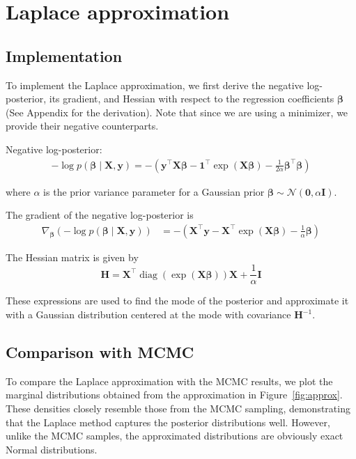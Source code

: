 \documentclass[9pt]{IEEEtran}
\begin{document}
\section{Laplace approximation}
\subsection{Implementation}
To implement the Laplace approximation, we 
first derive the negative log-posterior, its gradient,
 and Hessian with respect to the regression coefficients
  \(\boldsymbol{\beta}\) (See Appendix for the derivation).
   Note that since we are using a minimizer, we provide
  their negative counterparts.

Negative log-posterior: 
\begin{align}
-\log p(\boldsymbol{\beta} \mid \mathbf{X}, \mathbf{y}) 
= - \left( \mathbf{y}^\top \mathbf{X}\boldsymbol{\beta} - \mathbf{1}^\top \exp(\mathbf{X}\boldsymbol{\beta}) - \frac{1}{2\alpha} \boldsymbol{\beta}^\top \boldsymbol{\beta} \right)
\end{align}

\noindent where \(\alpha\) is the prior variance parameter for a Gaussian prior \(\boldsymbol{\beta} \sim \mathcal{N}(\mathbf{0}, \alpha \mathbf{I})\).

\vspace{1em}

\noindent The gradient of the negative log-posterior is
\begin{align}
\nabla_{\boldsymbol{\beta}} \left( -\log p(\boldsymbol{\beta} \mid \mathbf{X}, \mathbf{y}) \right) 
&= - \left( \mathbf{X}^\top \mathbf{y} - \mathbf{X}^\top \exp(\mathbf{X}\boldsymbol{\beta}) - \frac{1}{\alpha} \boldsymbol{\beta} \right)
\end{align}

\noindent The Hessian matrix is given by
\[
\mathbf{H} = \mathbf{X}^\top \operatorname{diag}\left(\exp(\mathbf{X}\boldsymbol{\beta})\right) \mathbf{X} + \frac{1}{\alpha} \mathbf{I}
\]

\vspace{1em}

These expressions are used to find the mode of the posterior
 and approximate it with a Gaussian distribution centered at 
 the mode with covariance \(\mathbf{H}^{-1}\).

\subsection{Comparison with MCMC}
To compare the Laplace approximation with the MCMC results, we plot
 the marginal distributions obtained from the approximation in 
 Figure~\ref{fig:approx}. These densities closely resemble those 
 from the MCMC sampling, demonstrating that the Laplace method 
 captures the posterior distributions well. However, unlike the
  MCMC samples, the approximated distributions are obviously exact Normal
   distributions.
\end{document}
